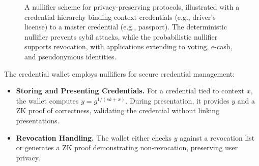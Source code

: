 \begin{figure}[!htb]
{
    }
    \caption[Nullifier Scheme]{A nullifier scheme for privacy-preserving protocols, illustrated with a credential hierarchy binding context credentials (e.g., driver's license) to a master credential (e.g., passport). The deterministic nullifier prevents sybil attacks, while the probabilistic nullifier supports revocation, with applications extending to voting, e-cash, and pseudonymous identities.}
    \label{fig:credential-nullifier-revised}
\end{figure}

The credential wallet employs nullifiers for secure credential management:

\begin{itemize}
    \item \textbf{Storing and Presenting Credentials.} For a credential tied to context $x$, the wallet computes $y = g^{1/(sk + x)}$. During presentation, it provides $y$ and a ZK proof of correctness, validating the credential without linking presentations.
    \item \textbf{Revocation Handling.} The wallet either checks $y$ against a revocation list or generates a ZK proof demonstrating non-revocation, preserving user privacy.
\end{itemize}


